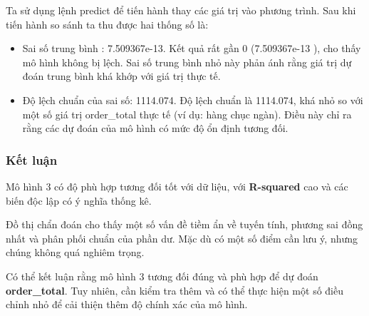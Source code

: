 Ta sử dụng lệnh predict để tiến hành thay các giá trị vào phương trình. Sau khi tiến hành so sánh ta thu được hai thống số là:
\begin{itemize}
  \item Sai số trung bình : 7.509367e-13. Kết quả rất gần 0 (7.509367e-13 ), cho thấy mô hình không bị lệch. Sai số trung bình nhỏ này phản ánh rằng giá trị dự đoán trung bình khá khớp với giá trị thực tế.
  \item Độ lệch chuẩn của sai số: 1114.074. Độ lệch chuẩn là 1114.074, khá nhỏ so với một số giá trị order\_total thực tế (ví dụ: hàng chục ngàn). Điều này chỉ ra rằng các dự đoán của mô hình có mức độ ổn định tương đối.
\end{itemize}

\subsubsection{Kết luận}

Mô hình 3 có độ phù hợp tương đối tốt với dữ liệu, với \textbf{R-squared} cao và các biến độc lập có ý nghĩa thống kê.

Đồ thị chẩn đoán cho thấy một số vấn đề tiềm ẩn về tuyến tính, phương sai đồng nhất và phân phối chuẩn của phần dư. Mặc dù có một số điểm cần lưu ý, nhưng chúng không quá nghiêm trọng.

Có thể kết luận rằng mô hình 3 tương đối đúng và phù hợp để dự đoán \textbf{order\_total}. Tuy nhiên, cần kiểm tra thêm và có thể thực hiện một số điều chỉnh nhỏ để cải thiện thêm độ chính xác của mô hình.








